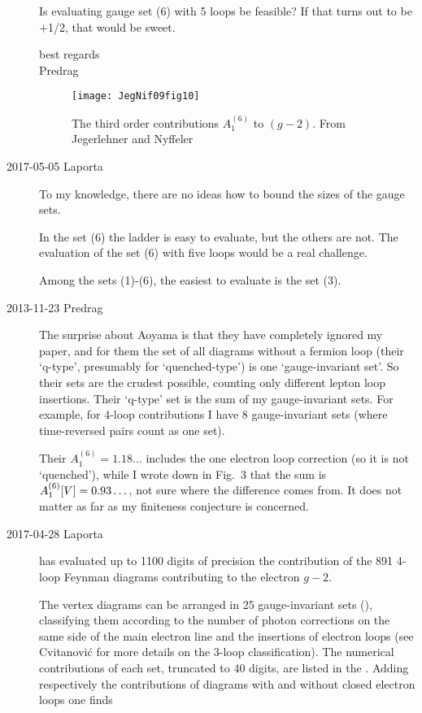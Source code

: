 \begin{description}
Is evaluating gauge set (6) with 5 loops be feasible? If that turns out to be
+1/2, that would be sweet.

best regards
\\
Predrag

\begin{figure}
\begin{center}
\texttt{[image: JegNif09fig10]}
\end{center}
\caption{\label{JegNif09fig10}
The third order contributions $A^{(6)}_1$ to $(g-2)$.
From Jegerlehner and Nyffeler
}
 \end{figure}


\item[2017-05-05 Laporta]
To my knowledge, there are no ideas how to bound the sizes of the gauge sets.

In the set (6) the ladder is easy to evaluate, but the others are not.
The evaluation of the set (6) with five loops would be a real challenge.

Among the sets (1)-(6), the easiest to evaluate is the set (3).

\item[2013-11-23  Predrag] The surprise about Aoyama \etal{}
is that they have completely ignored my paper, and for
them the set of all diagrams without a fermion loop (their `q-type',
presumably for `quenched-type') is one `gauge-invariant set'. So their sets
are the crudest possible, counting only different lepton loop insertions.
Their `q-type' set is the sum of my gauge-invariant sets. For example, for 4-loop
contributions I have 8 gauge-invariant sets (where time-reversed pairs count as
one set).

Their $A^{(6)}_1 = 1.18\dots $ includes the one electron
loop correction (so it is not `quenched'), while I wrote down in Fig.~3
that the sum is $A_1^{(6)}[V] = 0.93\dots $, not sure where the difference
comes from. It does not matter as far as my finiteness conjecture is
concerned.




\item[2017-04-28 Laporta] 
has evaluated up to 1100 digits of precision the contribution of the 891
4-loop Feynman diagrams contributing to the electron $g-2$.

The vertex diagrams can be arranged in 25
gauge-invariant sets (),
classifying them according to the number of photon corrections on the
same side of the main electron line and the insertions of electron loops (see
Cvitanovi\'c for more details on the 3-loop classification).
The numerical contributions of each set, truncated to 40 digits, are
listed in the .
Adding respectively the contributions of diagrams with and without
closed electron loops one finds


\end{description}
